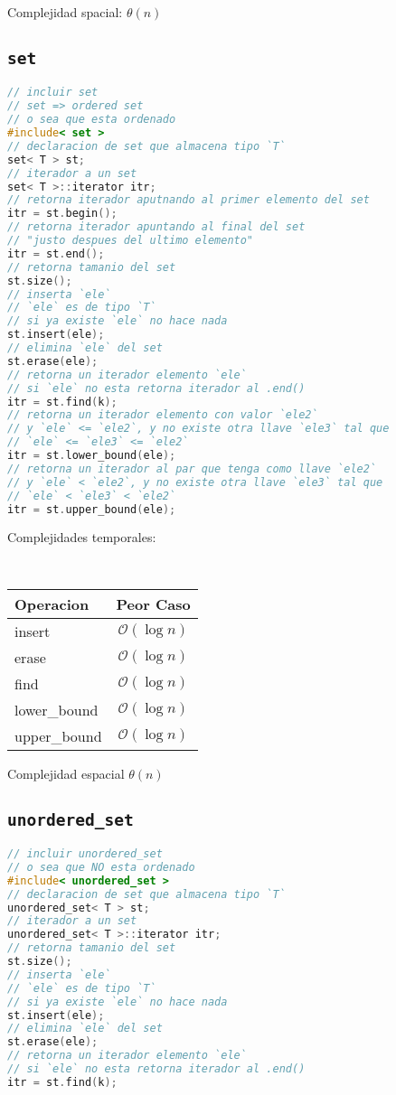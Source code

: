 \documentclass{article}
\newcommand{\bigO}{\mathcal{O}}
\begin{document}
\begin{multicols}{2}
Complejidad spacial: $\theta(n)$ 

\newpage
\subsection*{\tt\footnotesize set}
\begin{lstlisting}[language=C++]
// incluir set
// set => ordered set
// o sea que esta ordenado
#include< set >
// declaracion de set que almacena tipo `T`
set< T > st;
// iterador a un set
set< T >::iterator itr;
// retorna iterador aputnando al primer elemento del set
itr = st.begin();
// retorna iterador apuntando al final del set
// "justo despues del ultimo elemento"
itr = st.end();
// retorna tamanio del set
st.size();
// inserta `ele`
// `ele` es de tipo `T`
// si ya existe `ele` no hace nada
st.insert(ele);
// elimina `ele` del set
st.erase(ele);
// retorna un iterador elemento `ele`
// si `ele` no esta retorna iterador al .end()
itr = st.find(k);
// retorna un iterador elemento con valor `ele2`
// y `ele` <= `ele2`, y no existe otra llave `ele3` tal que
// `ele` <= `ele3` <= `ele2`
itr = st.lower_bound(ele);
// retorna un iterador al par que tenga como llave `ele2`
// y `ele` < `ele2`, y no existe otra llave `ele3` tal que
// `ele` < `ele3` < `ele2`
itr = st.upper_bound(ele);
\end{lstlisting}

Complejidades temporales:
\begin{table}[H]
  \tt \scriptsize
  \begin{center}
    \begin{tabular}[c]{l|c}
      \hline
      Operacion & Peor Caso \\
      \hline
      insert & $\bigO(\log n)$ \\
      \hline
      erase & $\bigO(\log n)$ \\
      \hline
      find & $\bigO(\log n)$ \\
      \hline
      lower\_bound & $\bigO(\log n)$ \\
      \hline
      upper\_bound & $\bigO(\log n)$ \\
      \hline
    \end{tabular}
  \end{center}
\end{table}

Complejidad espacial $\theta(n)$

\subsection*{\tt\footnotesize unordered\_set}
\begin{lstlisting}[language=C++]
// incluir unordered_set
// o sea que NO esta ordenado
#include< unordered_set >
// declaracion de set que almacena tipo `T`
unordered_set< T > st;
// iterador a un set
unordered_set< T >::iterator itr;
// retorna tamanio del set
st.size();
// inserta `ele`
// `ele` es de tipo `T`
// si ya existe `ele` no hace nada
st.insert(ele);
// elimina `ele` del set
st.erase(ele);
// retorna un iterador elemento `ele`
// si `ele` no esta retorna iterador al .end()
itr = st.find(k);
\end{lstlisting}


\end{multicols}
\end{document}
